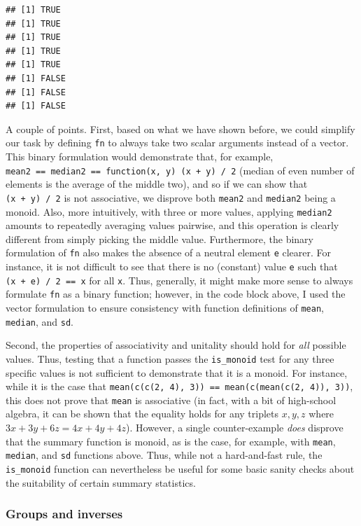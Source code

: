 \documentclass[
]{book}
\theoremstyle{definition}
\theoremstyle{definition}
\theoremstyle{definition}
\theoremstyle{definition}
\theoremstyle{remark}
\begin{document}
\begin{verbatim}
## [1] TRUE
## [1] TRUE
## [1] TRUE
## [1] TRUE
## [1] TRUE
## [1] FALSE
## [1] FALSE
## [1] FALSE
\end{verbatim}

A couple of points. First, based on what we have shown before, we could simplify our task by defining \texttt{fn} to always take two scalar arguments instead of a vector. This binary formulation would demonstrate that, for example, \texttt{mean2\ ==\ median2\ ==\ function(x,\ y)\ (x\ +\ y)\ /\ 2} (median of even number of elements is the average of the middle two), and so if we can show that \texttt{(x\ +\ y)\ /\ 2} is not associative, we disprove both \texttt{mean2} and \texttt{median2} being a monoid. Also, more intuitively, with three or more values, applying \texttt{median2} amounts to repeatedly averaging values pairwise, and this operation is clearly different from simply picking the middle value. Furthermore, the binary formulation of \texttt{fn} also makes the absence of a neutral element \texttt{e} clearer. For instance, it is not difficult to see that there is no (constant) value \texttt{e} such that \texttt{(x\ +\ e)\ /\ 2\ ==\ x} for all \texttt{x}. Thus, generally, it might make more sense to always formulate \texttt{fn} as a binary function; however, in the code block above, I used the vector formulation to ensure consistency with function definitions of \texttt{mean}, \texttt{median}, and \texttt{sd}.

Second, the properties of associativity and unitality should hold for \emph{all} possible values. Thus, testing that a function passes the \texttt{is\_monoid} test for any three specific values is not sufficient to demonstrate that it is a monoid. For instance, while it is the case that \texttt{mean(c(c(2,\ 4),\ 3))\ ==\ mean(c(mean(c(2,\ 4)),\ 3))}, this does not prove that \texttt{mean} is associative (in fact, with a bit of high-school algebra, it can be shown that the equality holds for any triplets \(x, y, z\) where \(3x + 3y + 6z = 4x + 4y + 4z\)). However, a single counter-example \emph{does} disprove that the summary function is monoid, as is the case, for example, with \texttt{mean}, \texttt{median}, and \texttt{sd} functions above. Thus, while not a hard-and-fast rule, the \texttt{is\_monoid} function can nevertheless be useful for some basic sanity checks about the suitability of certain summary statistics.

\subsubsection{Groups and inverses}\label{groups-and-inverses}
\end{document}
